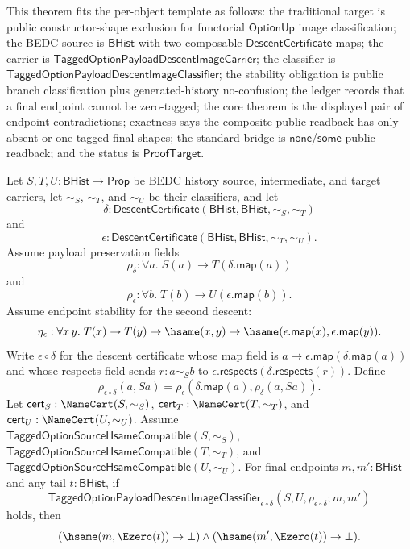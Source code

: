 \begin{theorem}
\label{thm:tagged-option-composite-image-classifier-zero-endpoint-exclusion}
This theorem fits the per-object template as follows: the traditional target is
public constructor-shape exclusion for functorial $\mathsf{OptionUp}$ image
classification; the BEDC source is $\mathsf{BHist}$ with two composable
$\mathsf{DescentCertificate}$ maps; the carrier is
$\mathsf{TaggedOptionPayloadDescentImageCarrier}$; the classifier is
$\mathsf{TaggedOptionPayloadDescentImageClassifier}$; the stability obligation
is public branch classification plus generated-history no-confusion; the ledger
records that a final endpoint cannot be zero-tagged; the core theorem is the
displayed pair of endpoint contradictions; exactness says the composite public
readback has only absent or one-tagged final shapes; the standard bridge is
$\mathsf{none}$/$\mathsf{some}$ public readback; and the status is
$\mathsf{ProofTarget}$.

Let $S,T,U:\mathsf{BHist}\to\mathsf{Prop}$ be BEDC history source,
intermediate, and target carriers, let $\sim_S$, $\sim_T$, and $\sim_U$ be their
classifiers, and let
$$
\delta:\mathsf{DescentCertificate}(\mathsf{BHist},\mathsf{BHist},\sim_S,\sim_T)
$$
and
$$
\epsilon:\mathsf{DescentCertificate}(\mathsf{BHist},\mathsf{BHist},\sim_T,\sim_U).
$$
Assume payload preservation fields
$$
\rho_{\delta}:\forall a.\;S(a)\to T(\delta.\mathsf{map}(a))
$$
and
$$
\rho_{\epsilon}:\forall b.\;T(b)\to U(\epsilon.\mathsf{map}(b)).
$$
Assume endpoint stability for the second descent:
$$
\eta_{\epsilon}:\forall x\,y.\;
T(x)\to T(y)\to \hsame(x,y)\to
\hsame(\epsilon.\mathsf{map}(x),\epsilon.\mathsf{map}(y)).
$$
Write $\epsilon\circ\delta$ for the descent certificate whose map field is
$a\mapsto\epsilon.\mathsf{map}(\delta.\mathsf{map}(a))$ and whose respects field
sends $r:a\sim_S b$ to
$\epsilon.\mathsf{respects}(\delta.\mathsf{respects}(r))$. Define
$$
\rho_{\epsilon\circ\delta}(a,Sa)=
\rho_{\epsilon}(\delta.\mathsf{map}(a),\rho_{\delta}(a,Sa)).
$$
Let $\mathsf{cert}_S:\NameCert(S,\sim_S)$,
$\mathsf{cert}_T:\NameCert(T,\sim_T)$, and
$\mathsf{cert}_U:\NameCert(U,\sim_U)$. Assume
$\mathsf{TaggedOptionSourceHsameCompatible}(S,\sim_S)$,
$\mathsf{TaggedOptionSourceHsameCompatible}(T,\sim_T)$, and
$\mathsf{TaggedOptionSourceHsameCompatible}(U,\sim_U)$. For final endpoints
$m,m':\mathsf{BHist}$ and any tail $t:\mathsf{BHist}$, if
$$
\mathsf{TaggedOptionPayloadDescentImageClassifier}_{\epsilon\circ\delta}
(S,U,\rho_{\epsilon\circ\delta};m,m')
$$
holds, then
$$
(\hsame(m,\Ezero(t))\to\bot)\land
(\hsame(m',\Ezero(t))\to\bot).
$$
\end{theorem}
